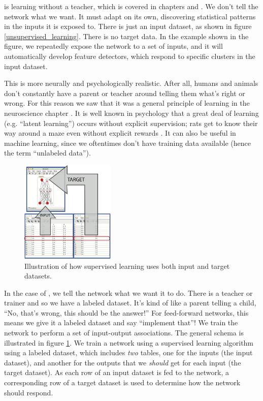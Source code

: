   is learning without a teacher, which is covered in chapters  and . We don't tell the network what we want. It must adapt on its own, discovering statistical patterns in the inputs it is exposed to. There is just an input dataset, as shown in figure \ref{unsupervised_learning}. There is no target data.  In the example shown in the figure, we repeatedly expose the network to a set of inputs, and it will automatically develop feature detectors, which respond to specific clusters in the input dataset.

This is  more neurally and psychologically realistic. After all, humans and animals don't constantly have a parent or teacher around telling them what's right or wrong.  For this reason we saw that it was a general principle of learning in the neuroscience chapter . It is well known in psychology that a great deal of learning (e.g. ``latent learning'') occurs without explicit supervision; rats get to know their way around a maze even without explicit rewards \cite{wang2021latent}. It can also be useful in  machine learning, since we oftentimes don't have training data available (hence the term ``unlabeled data''). 

\begin{figure}[h]
\centering
\includegraphics[width=0.4\textwidth]{./images/dataset_supervised.png}
\caption[Simbrain screenshot with graphical elements added by Pamela Payne.]{Illustration of how supervised learning uses both input and target datasets.}
\label{supervised_learning}
\end{figure}

In the case of , we tell the network what we want it to do. There is a teacher or trainer and so we have a labeled dataset. It's kind of like a parent telling a child, ``No, that's wrong, this should be the answer!'' For feed-forward networks, this means we give it a labeled dataset and say ``implement that''! We train the network to perform a set of input-output associations. The general schema is illustrated in figure \ref{supervised_learning}. We train a network using a supervised learning algorithm using a labeled dataset, which includes \emph{two} tables, one for the inputs (the input dataset), and another for the outputs that we \emph{should} get for each input (the target dataset). As each row of an input dataset is  fed to the network, a corresponding row of a target dataset is used to determine how the network should respond. 

